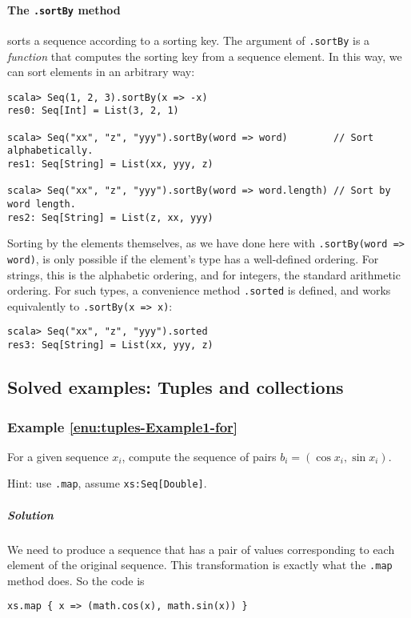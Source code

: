\paragraph*{The \lstinline!.sortBy! method}

sorts a sequence according to a sorting key. The argument of \lstinline!.sortBy!
is a \emph{function} that computes the sorting key from a sequence
element. In this way, we can sort elements in an arbitrary way:
\begin{lstlisting}
scala> Seq(1, 2, 3).sortBy(x => -x)
res0: Seq[Int] = List(3, 2, 1)

scala> Seq("xx", "z", "yyy").sortBy(word => word)        // Sort alphabetically.
res1: Seq[String] = List(xx, yyy, z)

scala> Seq("xx", "z", "yyy").sortBy(word => word.length) // Sort by word length.
res2: Seq[String] = List(z, xx, yyy)
\end{lstlisting}
Sorting by the elements themselves, as we have done here with \lstinline!.sortBy(word => word)!,
is only possible if the element's type has a well-defined ordering.
For strings, this is the alphabetic ordering, and for integers, the
standard arithmetic ordering. For such types, a convenience method
\lstinline!.sorted! is defined, and works equivalently to \lstinline!.sortBy(x => x)!:
\begin{lstlisting}
scala> Seq("xx", "z", "yyy").sorted
res3: Seq[String] = List(xx, yyy, z)
\end{lstlisting}


\subsection{Solved examples: Tuples and collections}

\subsubsection{Example \label{enu:tuples-Example1-for}\ref{enu:tuples-Example1-for}}

For a given sequence $x_{i}$, compute the sequence of pairs $b_{i}=\left(\cos x_{i},\sin x_{i}\right)$.

Hint: use \lstinline!.map!, assume \lstinline!xs:Seq[Double]!.

\subparagraph{Solution}

We need to produce a sequence that has a pair of values corresponding
to each element of the original sequence. This transformation is exactly
what the \lstinline!.map! method does. So the code is
\begin{lstlisting}
xs.map { x => (math.cos(x), math.sin(x)) }
\end{lstlisting}


